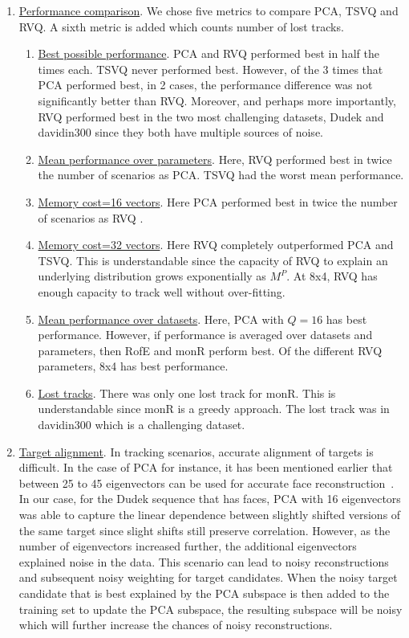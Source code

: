 \begin{enumerate}
\item \underline{Performance comparison}.  We chose five metrics to compare PCA, TSVQ and RVQ.  A sixth metric is added which counts number of lost tracks.
\begin{enumerate}
\item \underline{Best possible performance}.  PCA and RVQ performed best in half the times each.  TSVQ never performed best.  However, of the 3 times that PCA performed best, in 2 cases, the performance difference was not significantly better than RVQ.  Moreover, and perhaps more importantly, RVQ performed best in the two most challenging datasets, Dudek and davidin300 since they both have multiple sources of noise.
\item \underline{Mean performance over parameters}.  Here, RVQ performed best in twice the number of scenarios as PCA.  TSVQ had the worst mean performance.
\item \underline{Memory cost=16 vectors}.  Here PCA performed best in twice the number of scenarios as RVQ .
\item \underline{Memory cost=32 vectors}.  Here RVQ completely outperformed PCA and TSVQ.  This is understandable since the capacity of RVQ to explain an underlying distribution grows exponentially as $M^P$.  At 8x4, RVQ has enough capacity to track well without over-fitting.
\item \underline{Mean performance over datasets}.  Here, PCA with $Q=16$ has best performance.  However, if performance is averaged over datasets and parameters, then RofE and monR perform best.  Of the different RVQ parameters, 8x4 has best performance.
\item \underline{Lost tracks}.  There was only one lost track for monR.  This is understandable since monR is a greedy approach.  The lost track was in davidin300 which is a challenging dataset.
\end{enumerate}

\item \underline{Target alignment}.  In tracking scenarios, accurate alignment of targets is difficult.  In the case of PCA for instance, it has been mentioned earlier that between 25 to 45 eigenvectors can be used for accurate face reconstruction~\cite{1997_JNL_EigenVsFisherFaces_Bel}.  In our case, for the Dudek sequence that has faces, PCA with 16 eigenvectors was able to capture the linear dependence between slightly shifted versions of the same target since slight shifts still preserve correlation.  However, as the number of eigenvectors increased further, the additional eigenvectors explained noise in the data.  This scenario can lead to noisy reconstructions and subsequent noisy weighting for target candidates.  When the noisy target candidate that is best explained by the PCA subspace is then added to the training set to update the PCA subspace, the resulting subspace will be noisy which will further increase the chances of noisy reconstructions.  
\end{enumerate}

